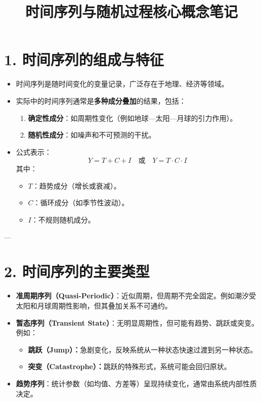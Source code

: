 \documentclass[12pt]{article}
\title{时间序列与随机过程核心概念笔记}
\author{}
\date{}
\begin{document}
\maketitle

\section*{1. 时间序列的组成与特征}
\begin{itemize}
    \item 时间序列是随时间变化的变量记录，广泛存在于地理、经济等领域。
    \item 实际中的时间序列通常是\textbf{多种成分叠加}的结果，包括：
    \begin{enumerate}[label=(\alph*)]
        \item \textbf{确定性成分}：如周期性变化（例如地球—太阳—月球的引力作用）。
        \item \textbf{随机性成分}：如噪声和不可预测的干扰。
    \end{enumerate}
    \item 公式表示：\[
    Y = T + C + I \quad \text{或} \quad Y = T \cdot C \cdot I
    \]
    其中：
    \begin{itemize}
        \item \( T \)：趋势成分（增长或衰减）。
        \item \( C \)：循环成分（如季节性波动）。
        \item \( I \)：不规则随机成分。
    \end{itemize}
\end{itemize}

---

\section*{2. 时间序列的主要类型}
\begin{itemize}
    \item \textbf{准周期序列（Quasi-Periodic）}：近似周期，但周期不完全固定。例如潮汐受太阳和月球周期性影响，但其叠加关系不可通约。
    \item \textbf{暂态序列（Transient State）}：无明显周期性，但可能有趋势、跳跃或突变。例如：
    \begin{itemize}
        \item \textbf{跳跃（Jump）：}急剧变化，反映系统从一种状态快速过渡到另一种状态。
        \item \textbf{突变（Catastrophe）：}跳跃的特殊形式，系统可能会回归原状。
    \end{itemize}
    \item \textbf{趋势序列}：统计参数（如均值、方差等）呈现持续变化，通常由系统内部性质决定。
\end{itemize}
\end{document}
